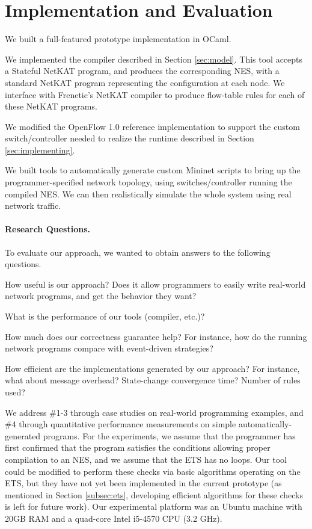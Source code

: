 \documentclass[pldi-cameraready]{sigplanconf}
\newcommand*\xmnote[3][0pt]{}
\begin{document}
\renewcommand*{\proofname}{Proof}


\section{Implementation and Evaluation}
\label{sec:eval}

We built a full-featured prototype implementation in OCaml.
\begin{compactitem}
\item We implemented the compiler described in Section \ref{sec:model}. This tool
accepts a Stateful NetKAT program, and produces the corresponding NES, with a standard
NetKAT program representing the configuration at each node.
We interface with Frenetic's NetKAT compiler to produce flow-table rules for each of these NetKAT programs.
\item We modified the OpenFlow 1.0 reference implementation to support the custom switch/controller needed to realize the runtime described
in Section \ref{sec:implementing}.
\item We built tools to automatically generate custom Mininet
scripts
to bring up the programmer-specified network topology, using switches/controller running
the compiled NES. We can then realistically simulate the whole system
using real network traffic.
\end{compactitem}

\paragraph{Research Questions.} To evaluate our approach, we wanted to obtain answers to the following questions.
\begin{compactenum}
\item How useful is our approach? Does it allow programmers to easily write
real-world network programs, and get the behavior they want?
\item What is the performance of our tools (compiler, etc.)?
\item How much does our correctness guarantee help? For instance, how do the
running network programs compare with  event-driven strategies?
\item How efficient are the implementations generated by our approach? For
instance, what about message overhead? State-change convergence time? Number of rules used?
\end{compactenum}

\noindent
We address \#1-3 through case studies on
real-world programming examples, and \#4 through quantitative performance measurements on simple
automatically-generated programs.
For the experiments, we assume that the programmer has first confirmed that the
program satisfies the conditions allowing proper compilation to an NES,
and we assume that the ETS has no loops.
Our tool could be modified to perform these checks
\xmnote{\FiveStar}{Q15}via basic algorithms operating on the ETS, but they
have not yet been implemented in the current prototype
(as mentioned in Section \ref{subsec:ets}, developing efficient algorithms
for these checks is left for future work).
Our experimental platform was an Ubuntu machine with 20GB
RAM and a quad-core Intel i5-4570 CPU (3.2 GHz).
\end{document}
